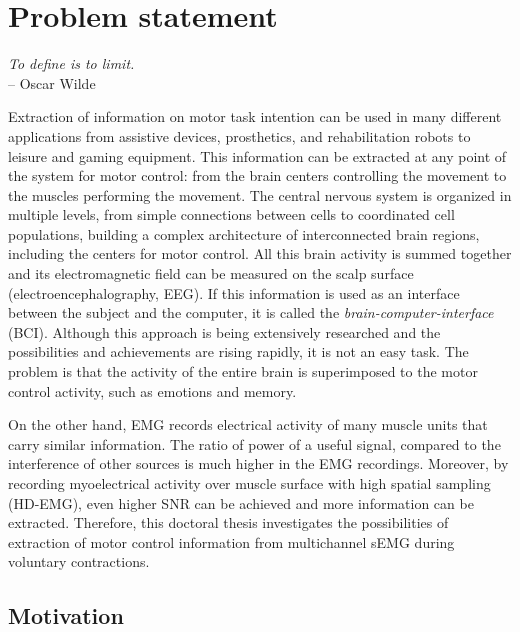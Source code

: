 \chapter{Problem statement}

\narrowlinespacing
\begin{myquote}
\begin{flushright}
\textit{To define is to limit.} \\-- Oscar Wilde
\end{flushright}
\end{myquote}
\normallinespacing

Extraction of information on motor task intention can be used in many different applications from assistive devices, prosthetics, and rehabilitation robots to leisure and gaming equipment. This information can be extracted at any point of the system for motor control: from the brain centers controlling the movement to the muscles performing the movement. The central nervous system is organized in multiple levels, from simple connections between cells to coordinated cell populations, building a complex architecture of interconnected brain regions, including the centers for motor control. All this brain activity is summed together and its electromagnetic field can be measured on the scalp surface (electroencephalography, EEG). If this information is used as an interface between the subject and the computer, it is called the \emph{brain-computer-interface} (BCI). Although this approach is being extensively researched and the possibilities and achievements are rising rapidly, it is not an easy task. The problem is that the activity of the entire brain is superimposed to the motor control activity, such as emotions and memory.

On the other hand, EMG records electrical activity of many muscle units that carry similar information. The ratio of power of a useful signal, compared to the interference of other sources is much higher in the EMG recordings. Moreover, by recording myoelectrical activity over muscle surface with high spatial sampling (HD-EMG), even higher SNR can be achieved and more information can be extracted. Therefore, this doctoral thesis investigates the possibilities of extraction of motor control information from multichannel sEMG during voluntary contractions.

    
    
    \section{Motivation}
    
